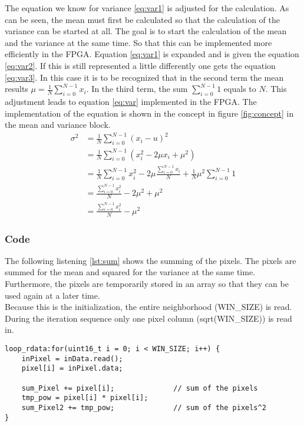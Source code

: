 The equation we know for variance \ref{eq:var1} is adjusted for the calculation.
As can be seen, the mean must first be calculated so that the calculation of the
variance can be started at all. The goal is to start the calculation of the mean
and the variance at the same time. So that this can be implemented more
efficiently in the FPGA.
Equation \ref{eq:var1} is expanded and is given the equation \ref{eq:var2}. If
this is still represented a little differently one gets the equation 
\ref{eq:var3}. In this case it is to be recognized that in the second term the
mean results $\mu = \frac{1}{N} \sum_{i = 0}^{N - 1} x_{i}$. In the third term,
the sum $\sum_{i = 0}^{N - 1} 1$ equals to $N$.
This adjustment leads to equation \ref{eq:var} implemented in the FPGA. The implementation of the equation is shown in the concept in figure \ref{fig:concept} in the mean and variance block.
\begin{align}
    \sigma^{2} & = \frac{1}{N} \sum_{i = 0}^{N - 1} (x_{i} - u)^{2} \label{eq:var1}\\ 
    		& = \frac{1}{N} \sum_{i = 0}^{N - 1} (x_{i}^{2} - 2 \mu x_{i} + \mu^{2})  \label{eq:var2}\\
    		& = \frac{1}{N} \sum_{i = 0}^{N - 1} x_{i}^{2} - 2\mu \frac{\sum_{i = 0}^{N - 1} x_{i}}{N} + \frac{1}{N} \mu^{2} \sum_{i = 0}^{N - 1} 1 \label{eq:var3}\\
    		& = \frac{\sum_{i = 0}^{N - 1} x_{i}^{2}}{N}  - 2\mu^{2} + \mu^{2} \label{eq:var4}\\
    		& = \frac{\sum_{i = 0}^{N - 1} x_{i}^{2}}{N}  - \mu^{2}
    \label{eq:var}
\end{align}

\subsubsection*{Code}
The following listening \ref{lst:sum} shows the summing of the pixels. The pixels are summed for the mean and squared for the variance at the same time. Furthermore, the pixels are temporarily stored in an array so that they can be used again at a later time. \\
Because this is the initialization, the entire neighborhood (WIN\_SIZE) is read. During the iteration sequence only one pixel column (sqrt(WIN\_SIZE)) is read in. \\
\begin{minipage}{\textwidth}
\begin{lstlisting}[style=CStyle, caption=Calculation of the sum, label=lst:sum]
loop_rdata:for(uint16_t i = 0; i < WIN_SIZE; i++) {
	inPixel = inData.read();
	pixel[i] = inPixel.data;

	sum_Pixel += pixel[i];				// sum of the pixels
	tmp_pow = pixel[i] * pixel[i];
	sum_Pixel2 += tmp_pow;				// sum of the pixels^2
}
\end{lstlisting}
\end{minipage}

